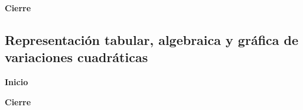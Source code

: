 \begin{boxK}
    \begin{center}\textbf{Cierre}\end{center}

\end{boxK}

\subsection{Representación tabular, algebraica y gr\'afica de variaciones cuadráticas}

\begin{boxK}
    \begin{center}\textbf{Inicio}\end{center}

\end{boxK}

\begin{boxK}
    \begin{center}\textbf{Cierre}\end{center}

\end{boxK}

\newpage